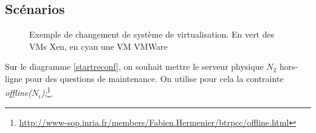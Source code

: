 \documentclass[a4paper]{article}
\begin{document}
\subsection{Scénarios}
\begin{figure}[!ht]
	\centering
	\caption{\label{usecase} Exemple de changement de système de
		virtualisation. En vert des VMs Xen, en cyan une VM VMWare}
\end{figure}

Sur le diagramme \ref{startreconf}, on souhait mettre le serveur physique
$N_2$ hors-ligne pour des questions de maintenance. On utilise pour cela
la contrainte \textit{offline($N_i$);}\footnote{\url{http://www-sop.inria.fr/members/Fabien.Hermenier/btrpcc/offline.html}}.
\end{document}
